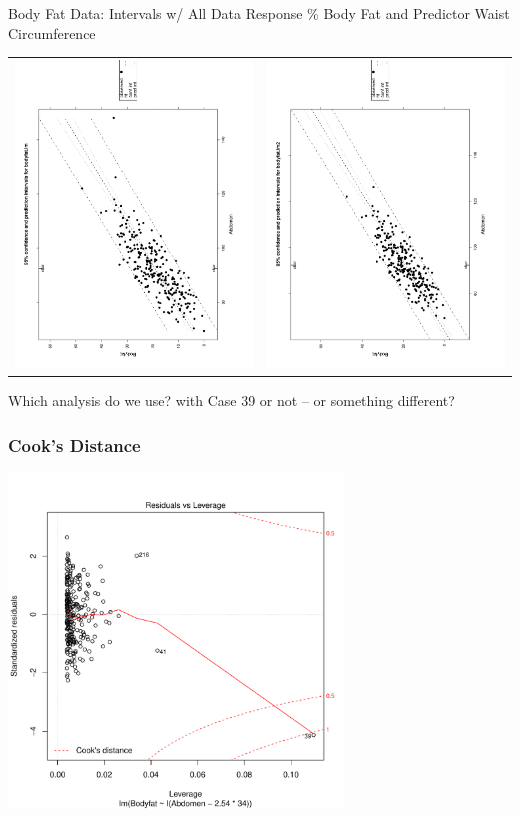 \documentclass[]{beamer}\usepackage[]{graphicx}\usepackage[]{color}
\begin{document}
\begin{frame}{Body Fat Data: Intervals w/ All Data}
Response \% Body Fat and Predictor Waist Circumference

  \begin{tabular}{cc}
{\includegraphics[height=2.in,angle=270]{pred}} &
{\includegraphics[height=2.in,angle=270]{pred-sub}}
  \end{tabular}

  Which analysis do we use?  with Case 39 or not -- or something different?


\end{frame}  \begin{frame} \frametitle{Cook's Distance}

{\includegraphics[height=3.5in]{CooksD}}

\end{frame}
\end{document}
